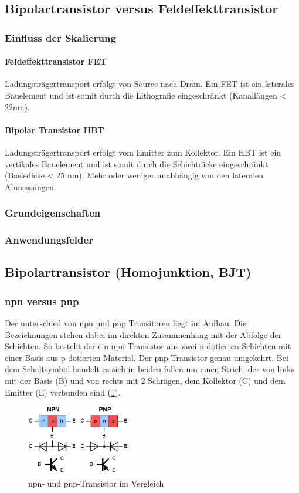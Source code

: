 \subsection{Bipolartransistor versus Feldeffekttransistor}
	\subsubsection{Einfluss der Skalierung}
	\paragraph{Feldeffekttransistor FET}
	Ladungsträgertransport erfolgt von Source
	nach Drain. Ein FET ist ein laterales Bauelement und ist somit durch die Lithografie eingeschränkt (Kanallängen < 22nm).
	
	\paragraph{Bipolar Transistor HBT}
	Ladungsträgertransport erfolgt vom Emitter
	zum Kollektor. Ein HBT ist ein vertikales Bauelement und ist somit durch die Schichtdicke eingeschränkt (Basisdicke < 25 nm). Mehr oder weniger unabhängig von den lateralen Abmessungen.
	\subsubsection{Grundeigenschaften}
	\subsubsection{Anwendungsfelder}
	
\subsection{Bipolartransistor (Homojunktion, BJT)}
	\subsubsection{npn versus pnp}
	Der unterschied von npn und pnp Transitoren liegt im Aufbau. Die Bezeichnungen stehen dabei im direkten Zusammenhang mit der Abfolge der Schichten. So besteht der ein npn-Transistor aus zwei n-dotierten Schichten mit einer Basis aus p-dotierten Material. Der pnp-Transistor genau umgekehrt. Bei dem Schaltsymbol handelt es sich in beiden fällen um einen Strich, der von links mit der Basis (B) und von rechts mit 2 Schrägen, dem Kollektor (C) und dem Emitter (E) verbunden sind (\ref{10_npn_pnp}).  
	\begin{figure}[h]
		\centering
		\includegraphics[width=0.4\textwidth]{Kapitel/Kap10/npn_pnp.png}
		\caption{npn- und pnp-Transistor im Vergleich}
		\label{10_npn_pnp}
	\end{figure}

